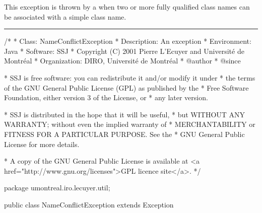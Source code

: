 
This exception is thrown by a 
when two or more fully qualified class names can be
associated with a simple class name.

\bigskip\hrule
\begin{code}\begin{hide}
/*
 * Class:        NameConflictException
 * Description:  An exception 
 * Environment:  Java
 * Software:     SSJ 
 * Copyright (C) 2001  Pierre L'Ecuyer and Université de Montréal
 * Organization: DIRO, Université de Montréal
 * @author       
 * @since

 * SSJ is free software: you can redistribute it and/or modify it under
 * the terms of the GNU General Public License (GPL) as published by the
 * Free Software Foundation, either version 3 of the License, or
 * any later version.

 * SSJ is distributed in the hope that it will be useful,
 * but WITHOUT ANY WARRANTY; without even the implied warranty of
 * MERCHANTABILITY or FITNESS FOR A PARTICULAR PURPOSE.  See the
 * GNU General Public License for more details.

 * A copy of the GNU General Public License is available at
   <a href="http://www.gnu.org/licenses">GPL licence site</a>.
 */\end{hide}
package umontreal.iro.lecuyer.util;


public class NameConflictException extends Exception\begin{hide} {
   private static final long serialVersionUID = -5124156035520217708L;
   private ClassFinder finder;
   private String name;
\end{hide}
\end{code}

